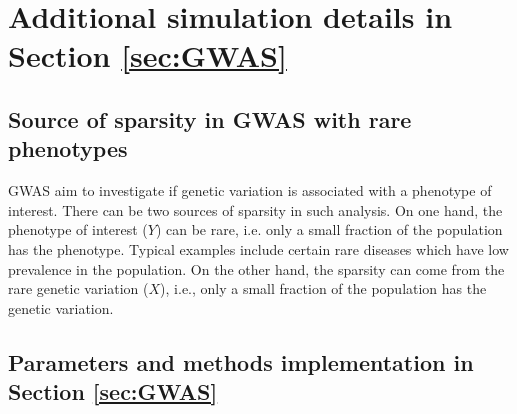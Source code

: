 \documentclass[12pt]{article}
\theoremstyle{definition}
\begin{document}
\clearpage

\section{Additional simulation details in Section \ref{sec:GWAS}}\label{sec:additional_details_GWAS}

\subsection{Source of sparsity in GWAS with rare phenotypes}\label{sec:source_sparsity_GWAS}

GWAS aim to investigate if genetic variation is associated with a phenotype of interest. There can be two sources of sparsity in such analysis. On one hand, the phenotype of interest ($Y$) can be rare, i.e. only a small fraction of the population has the phenotype. Typical examples include certain rare diseases which have low prevalence in the population. On the other hand, the sparsity can come from the rare genetic variation ($X$), i.e., only a small fraction of the population has the genetic variation. 


\subsection{Parameters and methods implementation in Section \ref{sec:GWAS}}\label{sec:simulation_methods_GWAS}
\end{document}

